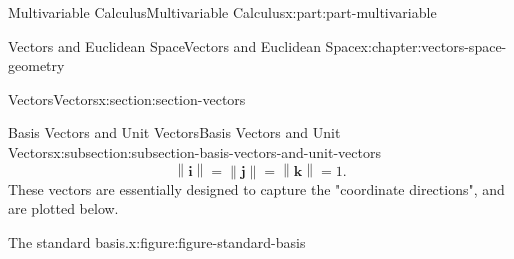 \documentclass[twoside,10pt,]{tufte-book}
\numberwithin{equation}{part}
\newcommand{\norm}[1]{\left\| #1 \right\|}
\begin{document}
\begin{partptx}{Multivariable Calculus}{}{Multivariable Calculus}{}{}{x:part:part-multivariable}
\begin{chapterptx}{Vectors and Euclidean Space}{}{Vectors and Euclidean Space}{}{}{x:chapter:vectors-space-geometry}
\begin{sectionptx}{Vectors}{}{Vectors}{}{}{x:section:section-vectors}
\begin{subsectionptx}{Basis Vectors and Unit Vectors}{}{Basis Vectors and Unit Vectors}{}{}{x:subsection:subsection-basis-vectors-and-unit-vectors}
%
\begin{equation*}
\norm{\mathbf{i}} = \norm{\mathbf{j}} = \norm{\mathbf{k}} = 1.
\end{equation*}
These vectors are essentially designed to capture the "coordinate directions", and are plotted below.%
\begin{figureptx}{The standard basis.}{x:figure:figure-standard-basis}{}%
\begin{image}{0.2}{0.6}{0.2}%
\end{image}
\end{figureptx}
\end{subsectionptx}
\end{sectionptx}
\end{chapterptx}
\end{partptx}
\end{document}
